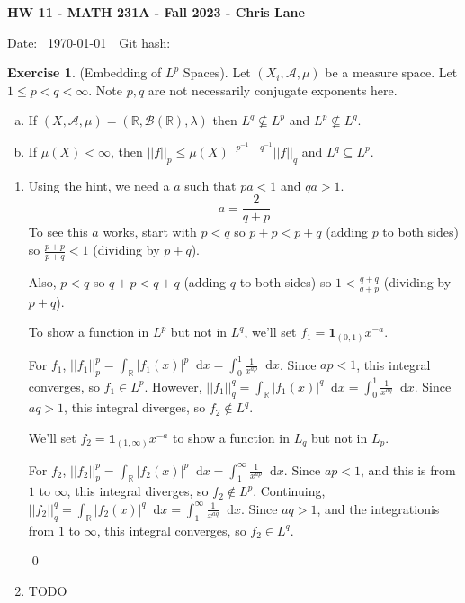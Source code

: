 \documentclass[11pt,oneside]{article}
\numberwithin{equation}{section}
\theoremstyle{definition}
\newtheorem{exercise}{Exercise}
\def\RR{\mathbb{R}}
\def\fancyA{\mathscr{A}}
\def\fancyB{\mathscr{B}}
\newcommand*\diff{\mathop{}\!\mathrm{d}}
\def\one{\mathbf{1}}
\begin{document}
\textbf{HW 11 - MATH 231A - Fall 2023 - Chris Lane}

Date: \hhmmsstime{} \ \today \ \ Git hash: 
 

\begin{exercise}
  (Embedding of $L^p$ Spaces).  Let $(X_i, \fancyA, \mu)$ be a measure space.
  Let $1 \leq p < q < \infty$.  Note $p, q$ are not necessarily
  conjugate exponents here.
  \begin{enumerate}[(a)]
  \item
    If $(X, \fancyA, \mu) = (\RR , \fancyB ( \RR), \lambda)$ then
    $L^q \nsubseteq L^p$ and     $L^p \nsubseteq L^q$.
  \item
    If $\mu(X) < \infty$, then $||f||_p \leq \mu(X)^{-p^{-1}-q^{-1}} || f|| _q$ and $L^q \subseteq L^p$. 
  \end{enumerate}

  
\end{exercise}
\begin{solution}
  \begin{enumerate}
  \item
    Using the hint, we need a $a$ such that $pa < 1$ and $qa > 1$.
    \[
    a = \frac{2}{q + p}
    \]
    To see this $a$ works, start with $p < q$ so $p + p < p + q$
    (adding $p$ to both sides) so $ \frac{p + p}{p + q} < 1$ (dividing
    by $p + q$).

    Also, $p < q$ so $ q + p < q + q$ (adding $q$ to both sides) so
    $1 < \frac{q + q}{q + p}$ (dividing by $p + q$).

    To show a function in $L^p$ but not in $L^q$, we'll set $f_1 = \one _ {(0, 1)} x^{-a}$.  

    For $f_1$, $|| f_1 || ^p _p = \int _\RR |f_1(x)| ^ p \diff x = \int _ 0^1 \frac{1}{x^{ap}} \diff x $. 
    Since $ap < 1$, this integral converges, so $f_1 \in L^p$.  However,
    $|| f_1 || ^q _q = \int _\RR |f_1(x)| ^ q \diff x = \int _ 0^1 \frac{1}{x^{aq}} \diff x $.
    Since $aq >1$, this integral diverges, so $f_2 \notin L^q$.

    We'll set $f_2 = \one _ {(1, \infty)}x^{-a}$ to show a function in $L_q$ but not in $L_p$.
    
    For $f_2$, $|| f_2 || ^p _p = \int _\RR |f_2(x)| ^ p \diff x = \int _ 1^\infty \frac{1}{x^{ap}} \diff x $. 
    Since $ap < 1$, and this is from $ 1 $ to $\infty$, this integral diverges, so $f_2 \notin L^p$.  Continuing, 
    $|| f_2 || ^q _q = \int _\RR |f_2(x)| ^ q \diff x = \int _ 1^\infty \frac{1}{x^{aq}} \diff x $.
    Since $aq >1$, and the integrationis from $1$ to $\infty$, this integral converges, so $f_2 \in L^q$.

    \qed
  \item
    TODO 

  \end{enumerate}
\end{solution}
\end{document}
